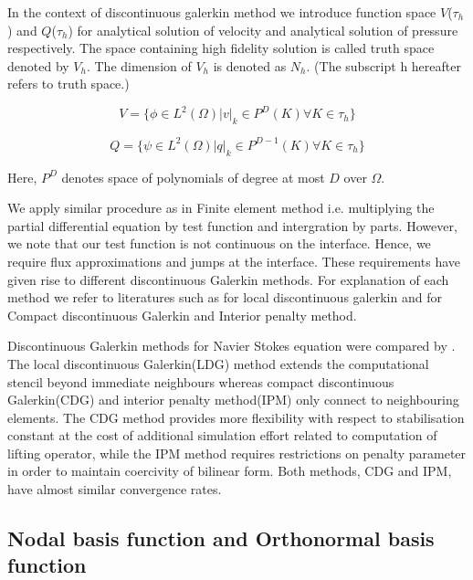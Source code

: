 \documentclass[a4paper,10pt]{book}
\begin{document}
In the context of discontinuous galerkin method we introduce function space $V$($\tau_h$) and $Q$($\tau_h$) for analytical solution of velocity and analytical solution of pressure respectively. The space containing high fidelity solution is called truth space denoted by $V_h$. The dimension of $V_h$ is denoted as $N_h$. (The subscript h hereafter refers to truth space.)

\begin{equation} \label{velocity_test}
V = \lbrace \phi \in L^2(\Omega)| v|_k \in P^D(K) \forall K \in \tau_h \rbrace
\end{equation}

\begin{equation} \label{pressure_test}
Q = \lbrace \psi \in L^2(\Omega)| q|_k \in P^{D-1}(K) \forall K \in \tau_h \rbrace
\end{equation}

Here, $P^D$ denotes space of polynomials of degree at most $D$ over $\Omega$.

We apply similar procedure as in Finite element method i.e. multiplying the partial differential equation by test function and intergration by parts. However, we note that our test function is not continuous on the interface. Hence, we require flux approximations and jumps at the interface. These requirements have given rise to different discontinuous Galerkin methods. For explanation of each method we refer to literatures such as \cite{persson} for local discontinuous galerkin and \cite{Montlaur} for Compact discontinuous Galerkin and Interior penalty method. 

Discontinuous Galerkin methods for Navier Stokes equation were compared by \cite{Montlaur}. The local discontinuous Galerkin(LDG) method extends the computational stencil beyond immediate neighbours whereas compact discontinuous Galerkin(CDG) and interior penalty method(IPM) only connect to neighbouring elements. The CDG method provides more flexibility with respect to stabilisation constant at the cost of additional simulation effort related to computation of lifting operator, while the IPM method requires restrictions on penalty parameter in order to maintain coercivity of bilinear form. Both methods, CDG and IPM, have almost similar convergence rates. 

\subsection{Nodal basis function and Orthonormal basis function}
\end{document}
